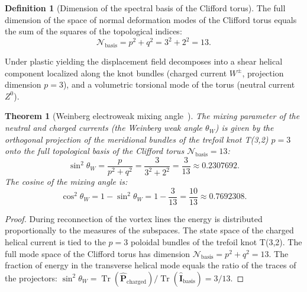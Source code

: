 \documentclass[11pt,a4paper]{article}
\newtheorem{theorem}{Theorem}
\theoremstyle{definition}
\newtheorem{definition}{Definition}
\theoremstyle{remark}
\begin{document}
\begin{definition}[Dimension of the spectral basis of the Clifford torus]
The full dimension of the space of normal deformation modes of the Clifford torus equals the sum of the squares of the topological indices:
\begin{equation}
\mathcal{N}_{\mathrm{basis}} = p^2 + q^2 = 3^2 + 2^2 = 13.
\label{eq:torus_basis_thirteen}
\end{equation}
\end{definition}
	
Under plastic yielding the displacement field decomposes into a shear helical component localized along the knot bundles (charged current $W^\pm$, projection dimension $p=3$), and a volumetric torsional mode of the torus (neutral current $Z^0$).
	
\begin{theorem}[Weinberg electroweak mixing angle~\cite{Weinberg1967}]
\label{thm:weinberg_exact_derivation}
The mixing parameter of the neutral and charged currents (the Weinberg weak angle $\theta_W$) is given by the orthogonal projection of the meridional bundles of the trefoil knot T(3,2) $p=3$ onto the full topological basis of the Clifford torus $\mathcal{N}_{\mathrm{basis}} = 13$:
\begin{equation}
	\sin^2\theta_W = \frac{p}{p^2 + q^2} = \frac{3}{3^2 + 2^2} = \frac{3}{13} \approx 0.2307692.
	\label{eq:weinberg_sin2_exact}
\end{equation}
The cosine of the mixing angle is:
\begin{equation}
	\cos^2\theta_W = 1 - \sin^2\theta_W = 1 - \frac{3}{13} = \frac{10}{13} \approx 0.7692308.
	\label{eq:weinberg_cos2_exact}
\end{equation}
\end{theorem}
	
\begin{proof}
During reconnection of the vortex lines the energy is distributed proportionally to the measures of the subspaces. The state space of the charged helical current is tied to the $p=3$ poloidal bundles of the trefoil knot T(3,2). The full mode space of the Clifford torus has dimension $\mathcal{N}_{\mathrm{basis}} = p^2 + q^2 = 13$. The fraction of energy in the transverse helical mode equals the ratio of the traces of the projectors: $\sin^2\theta_W = \operatorname{Tr}(\hat{\mathbf{P}}_{\mathrm{charged}}) / \operatorname{Tr}(\hat{\mathbf{I}}_{\mathrm{basis}}) = 3/13$.
\end{proof}
	
\end{document}

